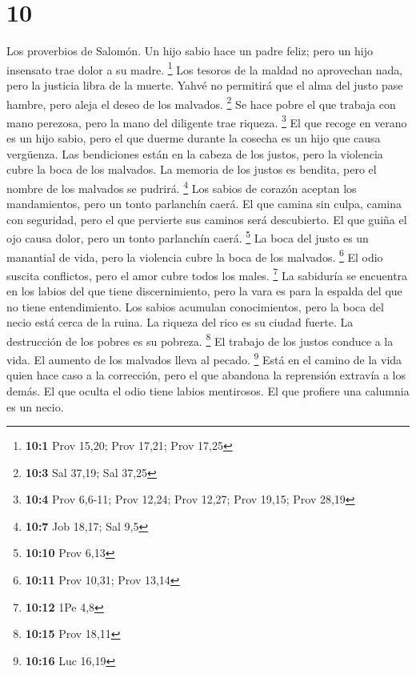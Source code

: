 \hypertarget{section-9}{%
\section{10}\label{section-9}}

 Los proverbios de Salomón. Un hijo sabio hace un padre
feliz; pero un hijo insensato trae dolor a su madre. \footnote{\textbf{10:1}
  Prov 15,20; Prov 17,21; Prov 17,25}  Los tesoros de la
maldad no aprovechan nada, pero la justicia libra de la muerte.
 Yahvé no permitirá que el alma del justo pase hambre,
pero aleja el deseo de los malvados. \footnote{\textbf{10:3} Sal 37,19;
  Sal 37,25}  Se hace pobre el que trabaja con mano
perezosa, pero la mano del diligente trae riqueza. \footnote{\textbf{10:4}
  Prov 6,6-11; Prov 12,24; Prov 12,27; Prov 19,15; Prov 28,19}
 El que recoge en verano es un hijo sabio, pero el que
duerme durante la cosecha es un hijo que causa vergüenza. 
Las bendiciones están en la cabeza de los justos, pero la violencia
cubre la boca de los malvados.  La memoria de los justos
es bendita, pero el nombre de los malvados se pudrirá. \footnote{\textbf{10:7}
  Job 18,17; Sal 9,5}  Los sabios de corazón aceptan los
mandamientos, pero un tonto parlanchín caerá.  El que
camina sin culpa, camina con seguridad, pero el que pervierte sus
caminos será descubierto.  El que guiña el ojo causa
dolor, pero un tonto parlanchín caerá. \footnote{\textbf{10:10} Prov
  6,13}  La boca del justo es un manantial de vida, pero
la violencia cubre la boca de los malvados. \footnote{\textbf{10:11}
  Prov 10,31; Prov 13,14}  El odio suscita conflictos,
pero el amor cubre todos los males. \footnote{\textbf{10:12} 1Pe 4,8}
 La sabiduría se encuentra en los labios del que tiene
discernimiento, pero la vara es para la espalda del que no tiene
entendimiento.  Los sabios acumulan conocimientos, pero
la boca del necio está cerca de la ruina.  La riqueza del
rico es su ciudad fuerte. La destrucción de los pobres es su pobreza.
\footnote{\textbf{10:15} Prov 18,11}  El trabajo de los
justos conduce a la vida. El aumento de los malvados lleva al pecado.
\footnote{\textbf{10:16} Luc 16,19}  Está en el camino de
la vida quien hace caso a la corrección, pero el que abandona la
reprensión extravía a los demás.  El que oculta el odio
tiene labios mentirosos. El que profiere una calumnia es un necio.
